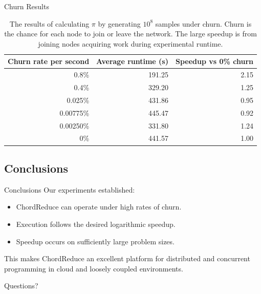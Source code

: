 \documentclass[11pt]{beamer}
\begin{document}
\begin{frame}{Churn Results}
\begin{table}
    \centering
    \begin{tabular}{|r|r|r|} 
        \hline 
        Churn rate per second & Average runtime (s) & Speedup vs 0\% churn\\ \hline{}
        0.8\% & 191.25 & 2.15 \\ \hline
        0.4\% & 329.20 & 1.25 \\ \hline
        0.025\% & 431.86 & 0.95 \\ \hline 
        0.00775\%  & 445.47 & 0.92 \\ \hline 
        0.00250\% & 331.80  &  1.24 \\ \hline 
        0\% & 441.57 & 1.00 \\ \hline
    \end{tabular}
    \caption{The results of calculating $\pi$ by generating $10^8$ samples under churn. Churn is the chance for each node to join or leave the network. The large speedup is from joining nodes acquiring work during experimental runtime.} 
    \label{churnSpeed}
\end{table}

\end{frame}




\subsection{Conclusions}

\begin{frame}{Conclusions}
Our experiments established:
\begin{itemize}
	\item ChordReduce can operate under high rates of churn.
	\item Execution follows the desired logarithmic speedup.
	\item Speedup occurs on sufficiently large problem sizes.
\end{itemize}

This makes ChordReduce an excellent platform for distributed and concurrent programming in cloud and loosely coupled environments.

\end{frame}


\begin{frame}{}
Questions?
\end{frame}



\end{document}
